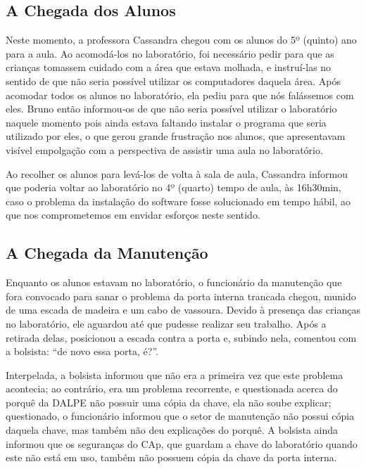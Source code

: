 \subsection{A Chegada dos Alunos}\label{sec:LABEL_CHP_REL_SEC_REL_SUBSEC_CHEG_AL}

Neste momento, a professora Cassandra chegou com os alunos do 5º (quinto) ano para a aula. Ao acomodá-los no laboratório, foi necessário pedir para que as crianças tomassem cuidado com a área que estava molhada, e instruí-las no sentido de que não seria possível utilizar os computadores daquela área. Após acomodar todos os alunos no laboratório, ela pediu para que nós falássemos com eles. Bruno então informou-os de que não seria possível utilizar o laboratório naquele momento pois ainda estava faltando instalar o programa que seria utilizado por eles, o que gerou grande frustração nos alunos, que apresentavam visível empolgação com a perspectiva de assistir uma aula no laboratório.

Ao recolher os alunos para levá-los de volta à sala de aula, Cassandra informou que poderia voltar ao laboratório no 4º (quarto) tempo de aula, às 16h30min, caso o problema da instalação do software fosse solucionado em tempo hábil, ao que nos comprometemos em envidar esforços neste sentido.

\subsection{A Chegada da Manutenção}\label{sec:LABEL_CHP_REL_SEC_REL_SUBSEC_CHEG_MAN}

Enquanto os alunos estavam no laboratório, o funcionário da manutenção que fora convocado para sanar o problema da porta interna trancada chegou, munido de uma escada de madeira e um cabo de vassoura. Devido à presença das crianças no laboratório, ele aguardou até que pudesse realizar seu trabalho. Após a retirada delas, posicionou a escada contra a porta e, subindo nela, comentou com a bolsista: “de novo essa porta, é?”.

Interpelada, a bolsista informou que não era a primeira vez que este problema acontecia; ao contrário, era um problema recorrente, e questionada acerca do porquê da DALPE não possuir uma cópia da chave, ela não soube explicar; questionado, o funcionário informou que o setor de manutenção não possui cópia daquela chave, mas também não deu explicações do porquê. A bolsista ainda informou que os seguranças do CAp, que guardam a chave do laboratório quando este não está em uso, também não possuem cópia da chave da porta interna.

